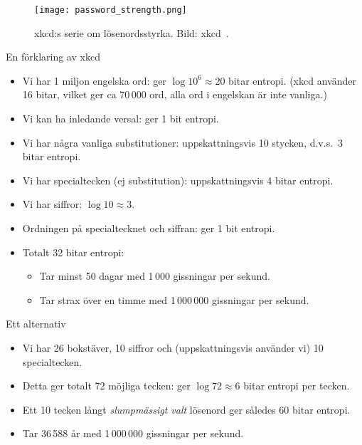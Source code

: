 \documentclass{beamer}
\begin{document}
\begin{frame}
  \begin{figure}
    \texttt{[image: password\_strength.png]}
    \caption{xkcd:s serie om lösenordsstyrka.
    Bild: xkcd~\cite{xkcd936}.}
  \end{figure}
\end{frame}

\begin{frame}{En förklaring av xkcd}
  \begin{itemize}
    \item Vi har 1 miljon engelska ord: ger \(\log 10^6 \approx 20\) bitar 
      entropi.
      (xkcd använder 16 bitar, vilket ger ca 70\,000 ord, alla ord i engelskan 
      är inte vanliga.)

    \item Vi kan ha inledande versal: ger 1 bit entropi.

    \item Vi har några vanliga substitutioner: uppskattningsvis 10 stycken, 
      d.v.s.~3 bitar entropi.

    \item Vi har specialtecken (ej substitution): uppskattningsvis 4 bitar 
      entropi.

    \item Vi har siffror: \(\log 10\approx 3\).

    \item Ordningen på specialtecknet och siffran: ger 1 bit entropi.

    \item Totalt 32 bitar entropi:
      \begin{itemize}
        \item Tar minst 50 dagar med 1\,000 gissningar per sekund.
        \item Tar strax över en timme med 1\,000\,000 gissningar per sekund.
      \end{itemize}

  \end{itemize}
\end{frame}

\begin{frame}
  \begin{example}{Ett alternativ}
    \begin{itemize}
      \item Vi har 26 bokstäver, 10 siffror och (uppskattningsvis använder vi) 
        10 specialtecken.

      \item Detta ger totalt 72 möjliga tecken: ger \(\log 72\approx 6\) bitar 
        entropi per tecken.

      \item Ett 10 tecken långt \emph{slumpmässigt valt} lösenord ger således 
        60 bitar entropi.

      \item Tar 36\,588 år med 1\,000\,000 gissningar per sekund.

    \end{itemize}
  \end{example}
\end{frame}
\end{document}
